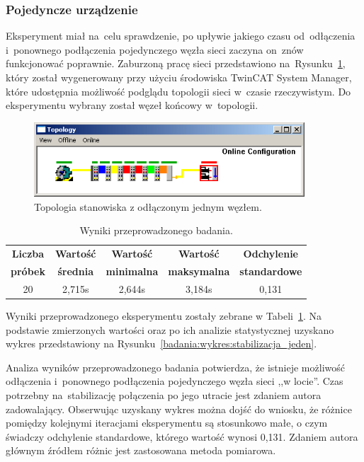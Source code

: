 \clearpage
\subsubsection{Pojedyncze urządzenie}
Eksperyment miał na~celu sprawdzenie, po upływie jakiego czasu od~odłączenia i~ponownego podłączenia pojedynczego węzła sieci zaczyna on~znów funkcjonować poprawnie. Zaburzoną pracę sieci przedstawiono na~Rysunku~\ref{one_slave}, który został wygenerowany przy użyciu środowiska TwinCAT System Manager, które udostępnia możliwość podglądu topologii sieci w~czasie rzeczywistym. Do eksperymentu wybrany został węzeł końcowy w~topologii.
\begin{figure}[!htb] 	\centering 	\includegraphics[width=0.9\textwidth]{images/topologyCXerror} \caption{Topologia stanowiska z odłączonym jednym węzłem.} \label{one_slave} \end{figure}

\begin{table}[!htb]
\begin{center}
\begin{tabular}{| c | c | c | c | c |}\hline
\textbf{Liczba} & \textbf{Wartość} & \textbf{Wartość} & \textbf{Wartość} & \textbf{Odchylenie} \\
\textbf{próbek} & \textbf{średnia} & \textbf{minimalna} & \textbf{maksymalna} & \textbf{standardowe} \\\hline\hline
20 & 2,715s & 2,644s & 3,184s & 0,131\\\hline
\end{tabular}
\end{center}
\vspace*{-6mm}
  \caption{Wyniki przeprowadzonego badania.}
	\label{badania:wyniki:stabilizacja_jeden}
\end{table}

\noindent Wyniki przeprowadzonego eksperymentu zostały zebrane w Tabeli~\ref{badania:wyniki:stabilizacja_jeden}. Na podstawie zmierzonych wartości oraz po ich analizie statystycznej uzyskano wykres przedstawiony na Rysunku~\ref{badania:wykres:stabilizacja_jeden}.

Analiza wyników przeprowadzonego badania potwierdza, że istnieje możliwość odłączenia i~ponownego podłączenia pojedynczego węzła sieci ,,w locie''. Czas potrzebny na~stabilizację połączenia po jego utracie jest zdaniem autora zadowalający. Obserwując uzyskany wykres można dojść do wniosku, że różnice pomiędzy kolejnymi iteracjami eksperymentu są stosunkowo małe, o czym świadczy odchylenie standardowe, którego wartość wynosi 0,131. Zdaniem autora głównym źródłem różnic jest zastosowana metoda pomiarowa.
\clearpage

